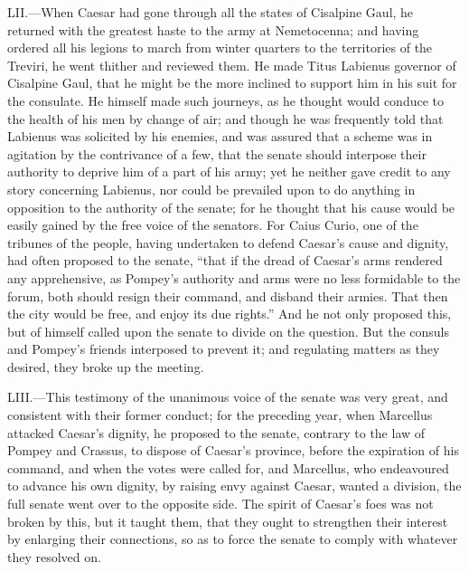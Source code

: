 LII.—When Caesar had gone through all the states of Cisalpine Gaul, he
returned with the greatest haste to the army at Nemetocenna; and having
ordered all his legions to march from winter quarters to the territories
of the Treviri, he went thither and reviewed them. He made Titus
Labienus governor of Cisalpine Gaul, that he might be the more inclined
to support him in his suit for the consulate. He himself made such
journeys, as he thought would conduce to the health of his men by change
of air; and though he was frequently told that Labienus was solicited by
his enemies, and was assured that a scheme was in agitation by the
contrivance of a few, that the senate should interpose their authority
to deprive him of a part of his army; yet he neither gave credit to any
story concerning Labienus, nor could be prevailed upon to do anything in
opposition to the authority of the senate; for he thought that his cause
would be easily gained by the free voice of the senators. For Caius
Curio, one of the tribunes of the people, having undertaken to defend
Caesar's cause and dignity, had often proposed to the senate, ``that if
the dread of Caesar's arms rendered any apprehensive, as Pompey's
authority and arms were no less formidable to the forum, both should
resign their command, and disband their armies. That then the city would
be free, and enjoy its due rights.'' And he not only proposed this, but
of himself called upon the senate to divide on the question. But the
consuls and Pompey's friends interposed to prevent it; and regulating
matters as they desired, they broke up the meeting.

LIII.—This testimony of the unanimous voice of the senate was very
great, and consistent with their former conduct; for the preceding year,
when Marcellus attacked Caesar's dignity, he proposed to the senate,
contrary to the law of Pompey and Crassus, to dispose of Caesar's
province, before the expiration of his command, and when the votes were
called for, and Marcellus, who endeavoured to advance his own dignity,
by raising envy against Caesar, wanted a division, the full senate went
over to the opposite side. The spirit of Caesar's foes was not broken by
this, but it taught them, that they ought to strengthen their interest
by enlarging their connections, so as to force the senate to comply with
whatever they resolved on.


